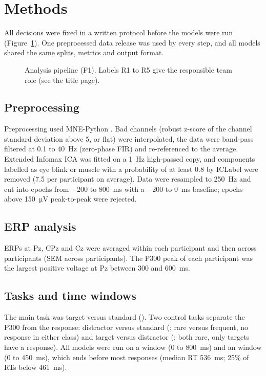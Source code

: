 \section{Methods}
\label{ch:methods}

All decisions were fixed in a written protocol before the models were run (Figure~\ref{fig:pipeline}). One preprocessed data release was used by every step, and all models shared the same splits, metrics and output format.

\begin{figure}[H]
\centering
{}
\caption{Analysis pipeline (F1). Labels R1 to R5 give the responsible team role (see the title page).}
\label{fig:pipeline}
\end{figure}

\subsection{Preprocessing}
\label{sec:preprocessing}
Preprocessing used MNE-Python \citep{gramfort2013}. Bad channels (robust z-score of the channel standard deviation above 5, or flat) were interpolated, the data were band-pass filtered at 0.1 to 40~Hz (zero-phase FIR) and re-referenced to the average. Extended Infomax ICA was fitted on a 1~Hz high-passed copy, and components labelled as eye blink or muscle with a probability of at least 0.8 by ICLabel \citep{piontonachini2019} were removed (7.5 per participant on average). Data were resampled to 250~Hz and cut into epochs from $-200$ to 800~ms with a $-200$ to 0~ms baseline; epochs above 150~µV peak-to-peak were rejected.

\subsection{ERP analysis}
\label{sec:erp-methods}
ERPs at Pz, CPz and Cz were averaged within each participant and then across participants (SEM across participants). The P300 peak of each participant was the largest positive voltage at Pz between 300 and 600~ms.

\subsection{Tasks and time windows}
\label{sec:tasks}
The main task was target versus standard (). Two control tasks separate the P300 from the response: distractor versus standard (; rare versus frequent, no response in either class) and target versus distractor (; both rare, only targets have a response). All models were run on a  window (0 to 800~ms) and an  window (0 to 450~ms), which ends before most responses (median RT 536~ms; 25\% of RTs below 461~ms).

